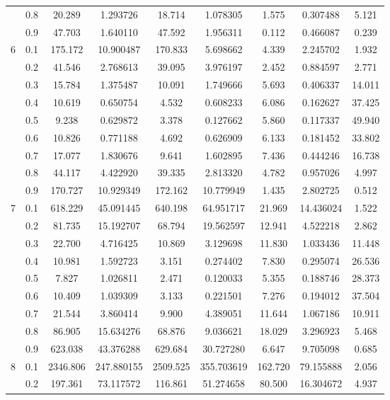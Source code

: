 \begin{longtable}{ | c | c || c | c | c | c | c | c | c | }
 & 0.8 & 20.289 & 1.293726 & 18.714 & 1.078305 & 1.575 & 0.307488 & 5.121 \\
 & 0.9 & 47.703 & 1.640110 & 47.592 & 1.956311 & 0.112 & 0.466087 & 0.239 \\
 \hline
\multirow{9}{*}{6} & 0.1 & 175.172 & 10.900487 & 170.833 & 5.698662 & 4.339 & 2.245702 & 1.932 \\
 & 0.2 & 41.546 & 2.768613 & 39.095 & 3.976197 & 2.452 & 0.884597 & 2.771 \\
 & 0.3 & 15.784 & 1.375487 & 10.091 & 1.749666 & 5.693 & 0.406337 & 14.011 \\
 & 0.4 & 10.619 & 0.650754 & 4.532 & 0.608233 & 6.086 & 0.162627 & 37.425 \\
 & 0.5 & 9.238 & 0.629872 & 3.378 & 0.127662 & 5.860 & 0.117337 & 49.940 \\
 & 0.6 & 10.826 & 0.771188 & 4.692 & 0.626909 & 6.133 & 0.181452 & 33.802 \\
 & 0.7 & 17.077 & 1.830676 & 9.641 & 1.602895 & 7.436 & 0.444246 & 16.738 \\
 & 0.8 & 44.117 & 4.422920 & 39.335 & 2.813320 & 4.782 & 0.957026 & 4.997 \\
 & 0.9 & 170.727 & 10.929349 & 172.162 & 10.779949 & 1.435 & 2.802725 & 0.512 \\
 \hline
\multirow{9}{*}{7} & 0.1 & 618.229 & 45.091445 & 640.198 & 64.951717 & 21.969 & 14.436024 & 1.522 \\
 & 0.2 & 81.735 & 15.192707 & 68.794 & 19.562597 & 12.941 & 4.522218 & 2.862 \\
 & 0.3 & 22.700 & 4.716425 & 10.869 & 3.129698 & 11.830 & 1.033436 & 11.448 \\
 & 0.4 & 10.981 & 1.592723 & 3.151 & 0.274402 & 7.830 & 0.295074 & 26.536 \\
 & 0.5 & 7.827 & 1.026811 & 2.471 & 0.120033 & 5.355 & 0.188746 & 28.373 \\
 & 0.6 & 10.409 & 1.039309 & 3.133 & 0.221501 & 7.276 & 0.194012 & 37.504 \\
 & 0.7 & 21.544 & 3.860414 & 9.900 & 4.389051 & 11.644 & 1.067186 & 10.911 \\
 & 0.8 & 86.905 & 15.634276 & 68.876 & 9.036621 & 18.029 & 3.296923 & 5.468 \\
 & 0.9 & 623.038 & 43.376288 & 629.684 & 30.727280 & 6.647 & 9.705098 & 0.685 \\
 \hline
\multirow{9}{*}{8} & 0.1 & 2346.806 & 247.880155 & 2509.525 & 355.703619 & 162.720 & 79.155888 & 2.056 \\
 & 0.2 & 197.361 & 73.117572 & 116.861 & 51.274658 & 80.500 & 16.304672 & 4.937 \\

\end{longtable}
